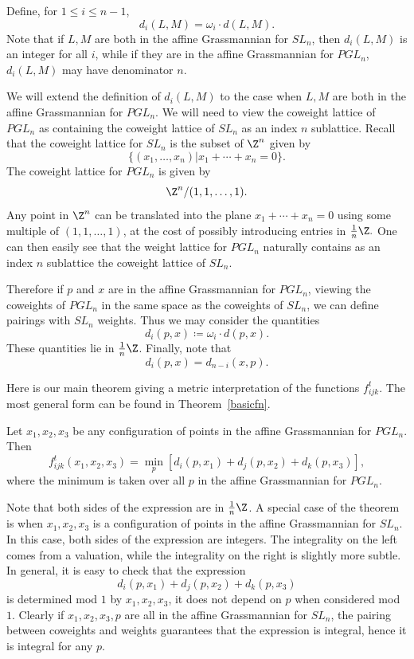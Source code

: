 Define, for $1 \leq i \leq n-1$,
\[
d_i(L,M) = \omega_i \cdot d(L,M).
\]
Note that if $L, M$ are both in the affine Grassmannian for $SL_n$, then $d_i(L,M)$ is an integer for all $i$, while if they are in the affine Grassmannian for $PGL_n$, $d_i(L,M)$ may have denominator $n$.

We will extend the definition of $d_i(L,M)$ to the case when $L, M$ are both in the affine Grassmannian for $PGL_n$. We will need to view the coweight lattice of $PGL_n$ as containing the coweight lattice of $SL_n$ as an index $n$ sublattice. Recall that the coweight lattice for $SL_n$ is the subset of $\Z^n$ given by 
\[
\{(x_1, \dots, x_n) | x_1 + \cdots + x_n=0\}.
\]
The coweight lattice for $PGL_n$ is given by
\[
\Z^n/(1, 1, \dots, 1).
\]
Any point in $\Z^n$ can be translated into the plane $x_1 + \cdots + x_n=0$ using some multiple of $(1, 1, \dots, 1)$, at the cost of possibly introducing entries in $\frac{1}{n} \Z.$ One can then easily see that the weight lattice for $PGL_n$ naturally contains as an index $n$ sublattice the coweight lattice of $SL_n$.

Therefore if $p$ and $x$ are in the affine Grassmannian for $PGL_n$, viewing the coweights of $PGL_n$ in the same space as the coweights of $SL_n$, we can define pairings with $SL_n$ weights. Thus we may consider the quantities 
\[
d_i(p,x) \coloneqq  \omega_i \cdot d(p,x).
\]
These quantities lie in $\frac{1}{n} \Z$. Finally, note that
\[
d_i(p,x) = d_{n-i}(x,p).
\]


Here is our main theorem giving a metric interpretation of the functions $f_{ijk}^t.$ The most general form can be found in Theorem~\ref{basicfn}.

\begin{theorem}\label{geometric} Let $x_1, x_2, x_3$ be any configuration of points in the affine Grassmannian for $PGL_n$. Then 
\begin{equation}\label{geoeqn}
f_{ijk}^t (x_1,x_2,x_3) = \min_{p} [d_i(p,x_1) + d_j(p,x_2) + d_k(p,x_3)],
\end{equation}
where the minimum is taken over all $p$ in the affine Grassmannian for $PGL_n$.
\end{theorem}

\begin{rema} Note that both sides of the expression are in $\frac{1}{n} \Z$. A special case of the theorem is when $x_1, x_2, x_3$ is a configuration of points in the affine Grassmannian for $SL_n$. In this case, both sides of the expression are integers. The integrality on the left comes from a valuation, while the integrality on the right is slightly more subtle. In general, it is easy to check that the expression 
\[
d_i(p,x_1) + d_j(p,x_2) + d_k(p,x_3)
\]
is determined mod $1$ by $x_1, x_2, x_3$, \ie it does not depend on $p$ when considered mod $1$. Clearly if $x_1, x_2, x_3, p$ are all in the affine Grassmannian for $SL_n$, the pairing between coweights and weights guarantees that the expression is integral, hence it is integral for any $p$.
\end{rema}

